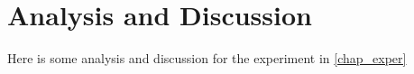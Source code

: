 \graphicspath{{main-matter/analysis-and-discussion/resources/}}

\chapter{Analysis and Discussion}\label{chap_a-and-d}

Here is some analysis and discussion for the experiment in \autoref{chap_exper}



